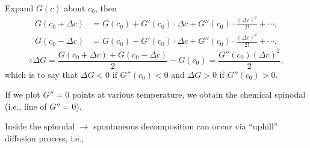 \documentclass[12pt]{article}
\begin{document}
Expand $G(c)$ about $c_0$, then
\begin{align*}
	G(c_0 + \Delta c) & =
	G(c_0) + G'(c_0) \cdot \Delta c +
	G''(c_0) \cdot \frac{ (\Delta c)^2 }{ 2! }
	+ \cdots,\\
	G(c_0 - \Delta c) & =
	G(c_0) - G'(c_0) \cdot \Delta c +
	G''(c_0) \cdot \frac{ (\Delta c)^2 }{ 2! }
	+ \cdots.
\end{align*}
\begin{equation*}
	\therefore \Delta G = \frac{ G(c_0 + \Delta c) + G(c_0 - \Delta c) }{ 2 }
	- G(c_0) = \frac{ G''(c_0) (\Delta c)^2 }{ 2 },
\end{equation*}
which is to say that $\Delta G < 0$ if $G''(c_0) < 0$ and $\Delta G > 0$ if
$G''(c_0) > 0$.

If we plot $G'' = 0$ points at various temperature, we obtain the chemical
spinodal (i.e., line of $G'' = 0$).



Inside the spinodal $\rightarrow$ spontaneous decomposition can occur
via ``uphill'' diffusion process, i.e.,
\begin{figure}[h]
	\centering
	\begin{minipage}[b]{.5\linewidth}
		\centering
		
	\end{minipage}%
	\hfil
	\begin{minipage}[b]{.5\linewidth}
		\centering

	\end{minipage}
\end{figure}
\end{document}
